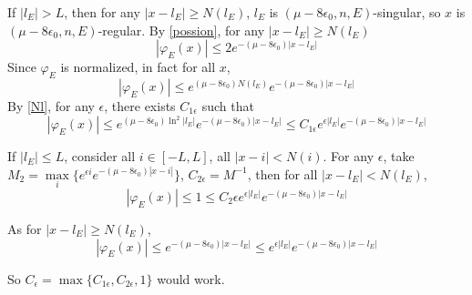 If $|l_E|>L$, then for any $|x-l_E|\geq N(l_E)$, $l_E$ is $(\mu-8\epsilon_0,n,E)$-singular, so $x$ is $(\mu-8\epsilon_0,n,E)$-regular. By \eqref{possion}, for any $|x-l_E|\geq N(l_E)$
  \[
    |\varphi_E(x)|\leq 2e^{-(\mu-8\epsilon_0)|x-l_E|}
  \]
Since $\varphi_E$ is normalized, in fact for all $x$,
\[
  |\varphi_E(x)|\leq e^{(\mu-8\epsilon_0)N(l_E)}e^{-(\mu-8\epsilon_0)|x-l_E|}
\]
By \eqref{Nl}, for any $\epsilon$, there exists $C_{1\epsilon}$ such that
\[
  |\varphi_E(x)|\leq e^{(\mu-8\epsilon_0)\ln^2 |l_E|} e^{-(\mu-8\epsilon_0)|x-l_E|}\leq C_{1\epsilon} e^{\epsilon |l_E|} e^{-(\mu-8\epsilon_0)|x-l_E|}
\]

If $|l_E|\leq L$, consider all $i\in[-L,L]$, all $|x-i|<N(i)$. For any $\epsilon$, take $M_2=\max\limits_i\{e^{\epsilon i} e^{-(\mu-8\epsilon_0)|x-i|}\}$, $C_{2\epsilon}=M^{-1}$, then for all  $|x-l_E|< N(l_E)$,
\[
  |\varphi_E(x)|\leq 1\leq C_2\epsilon e^{\epsilon |l_E|} e^{-(\mu-8\epsilon_0)|x-l_E|}
\]

As for $|x-l_E|\geq N(l_E)$,
\[
  |\varphi_E(x)|\leq e^{-(\mu-8\epsilon_0)|x-l_E|}\leq e^{\epsilon |l_E|}e^{-(\mu-8\epsilon_0)|x-l_E|}
\]

So  $C_\epsilon=\max\{C_{1\epsilon},C_{2\epsilon},1\}$ would work.





